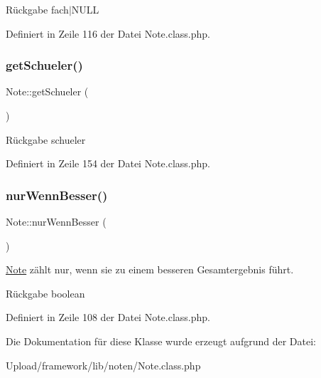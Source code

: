 \begin{DoxyReturn}{Rückgabe}
fach$\vert$\+N\+U\+LL 
\end{DoxyReturn}


Definiert in Zeile 116 der Datei Note.\+class.\+php.

\mbox{\label{class_note_a4d0b38e7b0436b3b238d20da2e9a9b96}} 
\subsubsection{\texorpdfstring{get\+Schueler()}{getSchueler()}}
{\footnotesize\ttfamily Note\+::get\+Schueler (\begin{DoxyParamCaption}{ }\end{DoxyParamCaption})}

\begin{DoxyReturn}{Rückgabe}
schueler 
\end{DoxyReturn}


Definiert in Zeile 154 der Datei Note.\+class.\+php.

\mbox{\label{class_note_ad194ac7e3251b7f468f88422412edfc5}} 
\subsubsection{\texorpdfstring{nur\+Wenn\+Besser()}{nurWennBesser()}}
{\footnotesize\ttfamily Note\+::nur\+Wenn\+Besser (\begin{DoxyParamCaption}{ }\end{DoxyParamCaption})}

\mbox{\hyperlink{class_note}{Note}} zählt nur, wenn sie zu einem besseren Gesamtergebnis führt. \begin{DoxyReturn}{Rückgabe}
boolean 
\end{DoxyReturn}


Definiert in Zeile 108 der Datei Note.\+class.\+php.



Die Dokumentation für diese Klasse wurde erzeugt aufgrund der Datei\+:\begin{DoxyCompactItemize}
\item 
Upload/framework/lib/noten/Note.\+class.\+php\end{DoxyCompactItemize}
